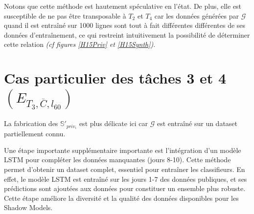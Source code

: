         Notons que cette méthode est hautement spéculative en l'état. De plus, elle est
        susceptible de ne pas être transposable à $T_2$ et $T_4$ car les données générées par $\mathcal G$ quand il est entraîné sur 1000 lignes
        sont tout à fait différentes différentes de ses données d'entraînement, ce qui restreint
        intuitivement la possibilité de déterminer cette relation \textit{(cf figures
        \ref{H15Priv} et \ref{H15Synth})}.
    \section{Cas particulier des tâches 3 et 4 $\left(E_{T_3, \overline C, l_{60}}\right)$}\label{casparT3}

            La fabrication des $\mathbb{S}'_{priv_i}$ est plus délicate ici car $\mathcal G$ est
        entraîné sur un dataset partiellement connu.

            Une étape importante supplémentaire importante est l'intégration d'un modèle LSTM
        pour compléter les données manquantes (jours 8-10). Cette méthode permet
        d'obtenir un dataset complet, essentiel pour entraîner les classifieurs. En effet, le
        modèle LSTM est entraîné sur les jours 1-7 des données publiques, et
        ses prédictions sont ajoutées aux données pour constituer un ensemble plus
        robuste. Cette étape améliore la diversité et la qualité des données disponibles
        pour les Shadow Models.
